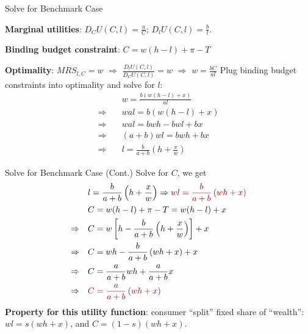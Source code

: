 \documentclass[11pt,aspectratio=169,usenames,dvipsnames]{beamer}
\newcommand{\red}[1]{\textcolor{red}{#1}}
\let\tempone\itemize
\let\temptwo\enditemize
\renewenvironment{itemize}{\tempone\addtolength{\itemsep}{\fill}}{\temptwo}
\begin{document}
\begin{frame}{Solve for Benchmark Case}
\label{slide:Solve_for_Benchmark_Case}
\begin{itemize}
    \item \textbf{Marginal utilities}: $ D_{C} U( C, l ) = \frac{a}{C} $; $ D_{l} U( C, l ) = \frac{b}{l} $.
    \item \textbf{Binding budget constraint}: $ C = w( h-l ) + \pi - T $
    \item \textbf{Optimality}: $ MRS_{l, C} = w $ $ \Rightarrow  $ $ \frac{D_{l}U( C, l )}{D_{C}U( C, l )} = w $ $ \Rightarrow  $ $ w = \frac{bC}{al} $
\end{itemize}
Plug binding budget constraints into optimality and solve for $ l $:
%
\begin{align}
        & w = \frac{b ( w( h-l ) + x )}{al}
    \\
    \Rightarrow \quad
        & w a l = b( w( h-l ) + x )
    \\
    \Rightarrow \quad
        & w a l = bwh - bwl + bx
    \\
    \Rightarrow \quad
        & ( a+b ) wl = bwh + bx
    \\
    \Rightarrow \quad
        & l = \frac{b}{a+b} \left( h + \frac{x}{w} \right)
\end{align}
%
\end{frame}

\begin{frame}{Solve for Benchmark Case (Cont.)}
\label{slide:Solve_for_Benchmark_Case__Cont__}
    Solve for $ C $, we get
    \begin{align}
            & l = \frac{b}{a+b} \left( h + \frac{x}{w} \right) \Rightarrow \red{w l = \frac{b}{a+b} \left( w h + x \right)}
        \\
            & C = w( h-l ) + \pi - T = w( h-l ) + x
        \\
        \Rightarrow \quad
            & C = w \left[
                h - \frac{b}{ a+b}
                \left( h + \frac{x}{w} \right)
            \right] + x
        \\
        \Rightarrow \quad
            & C = wh - \frac{b}{a+b} \left(
                wh + x
            \right) + x
        \\
        \Rightarrow \quad
            & C = \frac{a}{a+b} wh + \frac{a}{a+b} x
        \\
        \Rightarrow \quad
            & \red{C = \frac{a}{a+b} \left( wh + x \right)}
    \end{align}
    \textbf{Property for this utility function}: consumer ``\alert{split}'' fixed share of ``\alert{wealth}'': $ wl = s( wh + x ) $, and $ C = ( 1-s ) ( wh + x ) $.
\end{frame}
\end{document}
